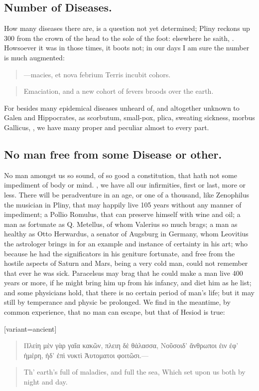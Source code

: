 {\subsection{Number of Diseases.}
How many diseases there are, is a question not yet determined;
Pliny reckons up 300 from the crown of the head to the sole
of the foot: elsewhere he saith, . Howsoever it was in those times, it boots not; in our days
I am sure the number is much augmented:
%
\begin{latin}
\begin{quote}
---macies, et nova febrium
Terris incubit cohors.
\end{quote}
\end{latin}
\translationrule
\begin{quote}%
Emaciation, and a new cohort of fevers broods over the earth.
\end{quote}
%
For besides many epidemical diseases unheard of, and altogether unknown
to Galen and Hippocrates, as scorbutum, small-pox, plica, sweating
sickness, morbus Gallicus, \etc{}, we have many proper and peculiar almost
to every part.

\subsection{No man free from some Disease or other.}
No man amongst us so sound, of so good a constitution, that hath not some impediment of body or
mind. , we have all our infirmities, first or
last, more or less. There will be peradventure in an age, or one of a
thousand, like Zenophilus the musician in Pliny, that may happily
live 105 years without any manner of impediment; a Pollio Romulus, that
can preserve himself with wine and oil; a man as fortunate as Q.
Metellus, of whom Valerius so much brags; a man as healthy as Otto
Herwardus, a senator of Augsburg in Germany, whom Leovitius the
astrologer brings in for an example and instance of certainty in his
art; who because he had the significators in his geniture fortunate,
and free from the hostile aspects of Saturn and Mars, being a very cold
man, could not remember that ever he was sick. Paracelsus may
brag that he could make a man live 400 years or more, if he might bring
him up from his infancy, and diet him as he list; and some physicians
hold, that there is no certain period of man's life; but it may still
by temperance and physic be prolonged. We find in the meantime, by
common experience, that no man can escape, but that of Hesiod is
true:
%
\begin{greek}[variant=ancient]
\begin{quote}
Πλείη μὲν γὰρ γαῖα κακῶν, πλειη δὲ θάλασσα,
Νοῦσοιδ' ἄνθρωποι ἐιν ἐφ' ἡμέρη, ἠδ' ἐπὶ νυκτὶ
Ἁυτοματοι φοιτῶσι.---
\end{quote}
\translationrule
\end{greek}
\begin{quote}
Th' earth's full of maladies, and full the sea,
Which set upon us both by night and day.
\end{quote}
%
}
